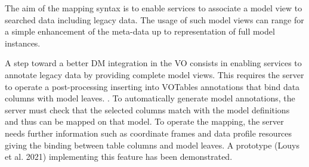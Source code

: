 The aim of the mapping syntax is to enable services to associate a model view to searched data including legacy data.
The usage of such model views can range for a simple enhancement of the meta-data up to representation of full model instances.

A step toward a better DM integration in the VO consists in enabling services to annotate
legacy data by providing complete model
views. This requires the server to operate a post-processing inserting into VOTables
annotations that bind data columns with model leaves. .
To automatically generate model annotations, the server must check that the selected columns 
match with the model definitions and thus can be
mapped on that model. To operate the mapping, the server needs further information
such as coordinate frames and data profile resources giving the binding between table
columns and model leaves. A prototype (Louys et al. 2021) implementing this feature
has been demonstrated.


